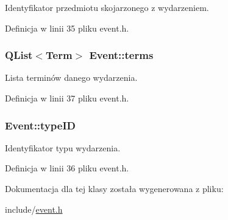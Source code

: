 Identyfikator przedmiotu skojarzonego z wydarzeniem. 



Definicja w linii 35 pliku event.h.

\hypertarget{classEvent_aff6cf909022d62edc3b633281d3121a6}{
\subsubsection[{terms}]{\setlength{\rightskip}{0pt plus 5cm}QList$<${\bf Term}$>$ {\bf Event::terms}}}
\label{classEvent_aff6cf909022d62edc3b633281d3121a6}


Lista terminów danego wydarzenia. 



Definicja w linii 37 pliku event.h.

\hypertarget{classEvent_a8abdf6e037043e6d6d761de593d33807}{
\subsubsection[{typeID}]{ {\bf Event::typeID}}}
\label{classEvent_a8abdf6e037043e6d6d761de593d33807}


Identyfikator typu wydarzenia. 



Definicja w linii 36 pliku event.h.



Dokumentacja dla tej klasy została wygenerowana z pliku:\begin{DoxyCompactItemize}
\item 
include/\hyperlink{event_8h}{event.h}\end{DoxyCompactItemize}
